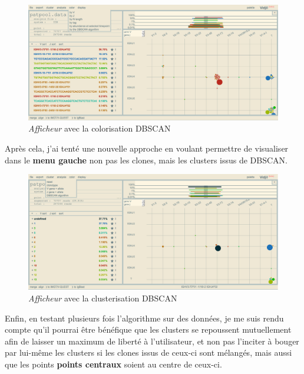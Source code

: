 \documentclass[pdftex,12pt,a4paper]{report}
\begin{document}
\begin{spacing}{1.2}
\begin{figure}[H]
\begin{center}
	\includegraphics[scale=0.35]{img/DBSCAN-Color-Ex.jpg}
\end{center}
\caption{\textit{Afficheur} avec la colorisation DBSCAN}
\end{figure}

Après cela, j'ai tenté une nouvelle approche en voulant permettre de visualiser dans le \textbf{menu gauche} non pas les clones, mais les clusters issus de DBSCAN.

\begin{figure}[H]
\begin{center}
	\includegraphics[scale=0.35]{img/DBSCAN-Cluster-Ex.jpg}
\end{center}
\caption{\textit{Afficheur} avec la clusterisation DBSCAN}
\end{figure}

Enfin, en testant plusieurs fois l'algorithme sur des données, je me suis rendu compte qu'il pourrai être bénéfique que les clusters se repoussent mutuellement afin de laisser un maximum de liberté à l'utilisateur, et non pas l'inciter à bouger par lui-même les clusters si les clones issus de ceux-ci sont mélangés, mais aussi que les points \textbf{points centraux} soient au centre de ceux-ci.


\end{spacing}
\end{document}
